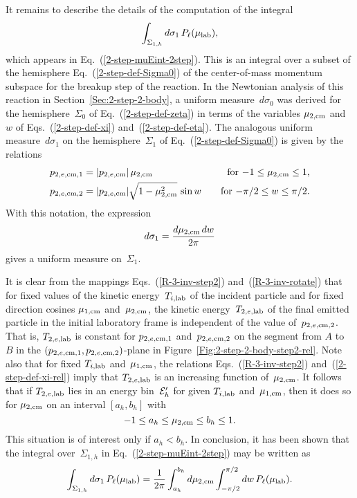 {It remains to describe the details of the computation of
the integral
$$
    \int_{\Sigma_{1,h}} d\sigma_1 \, P_\ell( \mu_{\text{lab}} ),
$$
which appears in Eq.~(\ref{2-step-muEint-2step}).
This is an integral over a subset of the hemisphere
Eq.~(\ref{2-step-def-Sigma0}) of the center-of-mass
momentum subspace for the breakup step of the reaction.
In the Newtonian analysis of this reaction in Section~\ref{Sec:2-step-2-body},
a uniform measure~$d\sigma_0$ was derived for the
hemisphere~$\Sigma_0$ of Eq.~(\ref{2-step-def-zeta}) in
terms of the variables $\mu_{\text{2,cm}}$ and~$w$ of Eqs.~(\ref{2-step-def-xi})
and~(\ref{2-step-def-eta}).  The analogous uniform measure~$d\sigma_1$
on the hemisphere~$\Sigma_1$ of Eq.~(\ref{2-step-def-Sigma0})
is given by the relations
\begin{alignat}{2}
  p_{2,e,\textrm{cm},1} &= |p_{2,e,\textrm{cm}}| \, \mu_{\text{2,cm}}
    \quad &\text{for $-1 \le \mu_{\text{2,cm}} \le 1$,} 
      \label{2-step-def-xi-rel} \\
  p_{2,e,\textrm{cm},2} &= |p_{2,e,\textrm{cm}}| \sqrt{ 1 - \mu_{\text{2,cm}}^2 } \, \sin w     
    \quad &\text{for $-\pi/2 \le w \le \pi/2$}.
   \label{2-step-def-eta-rel}
\end{alignat}
With this notation, the expression
$$
  d\sigma_1 = \frac{ d \mu_{\text{2,cm}} \, dw}{2 \pi}
$$
gives a uniform measure on~$\Sigma_1$.

\begin{figure}

\end{figure}

It is clear from the mappings Eqs.~(\ref{R-3-inv-step2}) and~(\ref{R-3-inv-rotate})
that for fixed values of the kinetic energy~$T_{i,\textrm{lab}}$ of the incident
particle and for fixed direction cosines $\mu_{\text{1,cm}}$ and~$\mu_{\text{2,cm}}$,
the kinetic energy~$T_{2,e,\textrm{lab}}$ of the final emitted particle in the initial
laboratory frame is independent of the value of~$p_{2,e,\textrm{cm},2}$.
That is, $T_{2,e,\textrm{lab}}$ is constant for $p_{2,e,\textrm{cm},1}$ and~$p_{2,e,\textrm{cm},2}$ on
the segment from $A$ to~$B$ in the $(p_{2,e,\textrm{cm},1}, p_{2,e,\textrm{cm},2})$-plane
in Figure~\ref{Fig:2-step-2-body-step2-rel}.
Note also that for fixed $T_{i,\textrm{lab}}$ and~$\mu_{\text{1,cm}}$, the relations
Eqs.~(\ref{R-3-inv-step2}) and~(\ref{2-step-def-xi-rel}) imply that
$T_{2,e,\textrm{lab}}$ is an increasing function of~$\mu_{\text{2,cm}}$.  It follows
that if $T_{2,e,\textrm{lab}}$ lies in an energy bin~${\cal E}_h'$ for given
$T_{i,\textrm{lab}}$ and~$\mu_{\text{1,cm}}$, then it does so for $\mu_{\text{2,cm}}$ on
an interval $[a_h, b_h]$ with
$$
  -1 \le a_h \le \mu_{\text{2,cm}} \le b_h \le 1.
$$
This situation is of interest only if $a_h < b_h$.  In conclusion,
it has been shown that the integral over~$\Sigma_{1,h}$ in
Eq.~(\ref{2-step-muEint-2step}) may be written as
\begin{equation*}
   \int_{\Sigma_{1,h}} d\sigma_1 \, P_\ell( \mu_{\text{lab}} ) =
   \frac{1}{2 \pi }
   \int_{ a_h}^{b_h} d\mu_{\text{2,cm}} \int_{- \pi/2}
                           ^{\pi/2} dw \,
          P_\ell( \mu_{\text{lab}} ) .
\end{equation*}




} %
